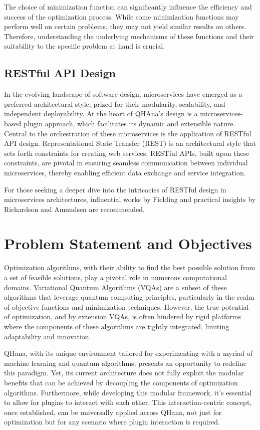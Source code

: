 \documentclass[
  a4paper,  %
  twoside,  %
  bibliography=totoc,
  headsepline,
  cleardoublepage=empty,
  parskip=half,
  draft=false
]{scrbook}
\begin{document}
The choice of minimization function can significantly influence the efficiency and success of the optimization process.
While some minimization functions may perform well on certain problems, they may not yield similar results on others.
Therefore, understanding the underlying mechanisms of these functions and their suitability to the specific problem at hand is crucial.


\section{RESTful API Design}
In the evolving landscape of software design, microservices have emerged as a preferred architectural style, prized for their modularity, scalability, and independent deployability.
At the heart of QHAna's design is a microservices-based plugin approach, which facilitates its dynamic and extensible nature.
Central to the orchestration of these microservices is the application of RESTful API design.
Representational State Transfer (REST) is an architectural style that sets forth constraints for creating web services.
RESTful APIs, built upon these constraints, are pivotal in ensuring seamless communication between individual microservices, thereby enabling efficient data exchange and service integration.

For those seeking a deeper dive into the intricacies of RESTful design in microservices architectures, influential works by Fielding \cite{Fielding2000} and practical insights by Richardson and Amundsen \cite{Richardson2013} are recommended.

\chapter{Problem Statement and Objectives}
\label{chap:problem}

Optimization algorithms, with their ability to find the best possible solution from a set of feasible solutions, play a pivotal role in numerous computational domains.
Variational Quantum Algorithms (VQAs) are a subset of these algorithms that leverage quantum computing principles, particularly in the realm of objective functions and minimization techniques.
However, the true potential of optimization, and by extension VQAs, is often hindered by rigid platforms where the components of these algorithms are tightly integrated, limiting adaptability and innovation.

QHana, with its unique environment tailored for experimenting with a myriad of machine learning and quantum algorithms, presents an opportunity to redefine this paradigm.
Yet, its current architecture does not fully exploit the modular benefits that can be achieved by decoupling the components of optimization algorithms.
Furthermore, while developing this modular framework, it's essential to allow for plugins to interact with each other.
This interaction-centric concept, once established, can be universally applied across QHana, not just for optimization but for any scenario where plugin interaction is required.
\end{document}
